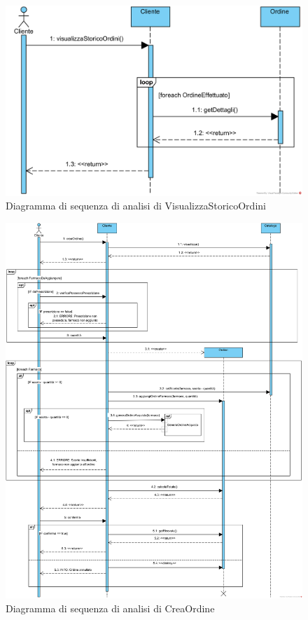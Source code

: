 \begin{figure}[!hbp]
	\centering
	\includegraphics[width=0.8\linewidth]{assets/sequence_analisi/SequenceAnalisiVisualizzaStoricoOrdini.png}
	\caption{Diagramma di sequenza di analisi di VisualizzaStoricoOrdini}
\end{figure}

\pagebreak

\begin{figure}[!hbp]
	\centering
	\includegraphics[width=\linewidth]{assets/sequence_analisi/SequenceAnalisiCreaOrdine.png}
	\caption{Diagramma di sequenza di analisi di CreaOrdine}
\end{figure}

